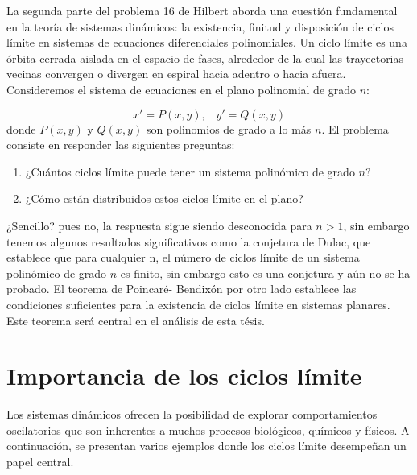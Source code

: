 \documentclass[12pt, a4paper]{report}
\begin{document}
La segunda parte del problema 16 de Hilbert aborda una cuestión fundamental en la teoría de sistemas dinámicos: la existencia, finitud y disposición de ciclos límite en sistemas de ecuaciones diferenciales polinomiales. Un ciclo límite es una órbita cerrada aislada en el espacio de fases, alrededor de la cual las trayectorias vecinas convergen o divergen en espiral hacia adentro o hacia afuera.\\

Consideremos el sistema de ecuaciones  en el plano polinomial de grado $n$:

\begin{equation}
	x'=P\left(x,y\right)\text{, }\text{  }y'=Q\left(x,y\right)
\end{equation}
donde $P\left(x,y\right)$ y $Q\left(x,y\right)$ son polinomios de grado a lo más $n$. El problema consiste en responder las siguientes preguntas:
\begin{enumerate}
	\item ¿Cuántos ciclos límite puede tener un sistema polinómico de grado $n$?
	\item ¿Cómo están distribuidos estos ciclos límite en el plano?
\end{enumerate}

¿Sencillo? pues no, la respuesta sigue siendo desconocida para $n>1$, sin embargo tenemos algunos resultados significativos como la conjetura de Dulac, que establece que para cualquier n, el número de ciclos límite de un sistema polinómico de grado $n$ es finito, sin embargo esto es una conjetura y aún no se ha probado. El teorema de Poincaré- Bendixón por otro lado establece las condiciones suficientes para la existencia de ciclos límite en sistemas planares. Este teorema será central en el análisis de esta tésis.

\section{Importancia de los ciclos límite}

Los sistemas dinámicos ofrecen la posibilidad de explorar comportamientos oscilatorios que son inherentes a muchos procesos biológicos, químicos y físicos. A continuación, se presentan varios ejemplos donde los ciclos límite desempeñan un papel central.
\end{document}
